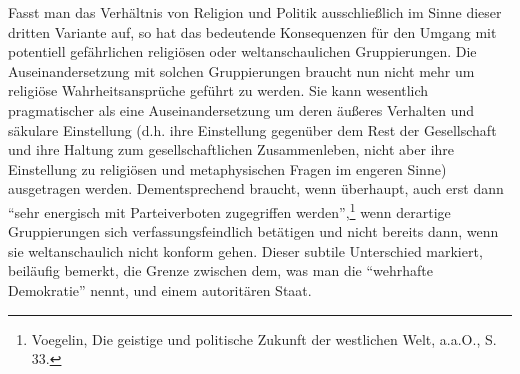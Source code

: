 Fasst man das Verhältnis von Religion und Politik ausschließlich im Sinne
dieser dritten Variante auf, so hat das bedeutende Konsequenzen für den Umgang
mit potentiell gefährlichen religiösen oder weltanschaulichen Gruppierungen.
Die Auseinandersetzung mit solchen Gruppierungen braucht nun nicht mehr um
religiöse Wahrheitsansprüche geführt zu werden. Sie kann wesentlich
pragmatischer als eine Auseinandersetzung um deren äußeres Verhalten und
säkulare Einstellung (d.h. ihre Einstellung gegenüber dem Rest der
Gesellschaft und ihre Haltung zum gesellschaftlichen Zusammenleben, nicht aber
ihre Einstellung zu religiösen und metaphysischen Fragen im engeren Sinne)
ausgetragen werden. Dementsprechend braucht, wenn überhaupt, auch erst dann
"`sehr energisch mit Parteiverboten zugegriffen werden"',\footnote{Voegelin,
  Die geistige und politische Zukunft der westlichen Welt, a.a.O., S. 33.}
wenn derartige Gruppierungen sich verfassungsfeindlich betätigen und nicht
bereits dann, wenn sie weltanschaulich nicht konform gehen. Dieser subtile
Unterschied markiert, beiläufig bemerkt, die Grenze zwischen dem, was man die
"`wehrhafte Demokratie"' nennt, und einem autoritären Staat.

